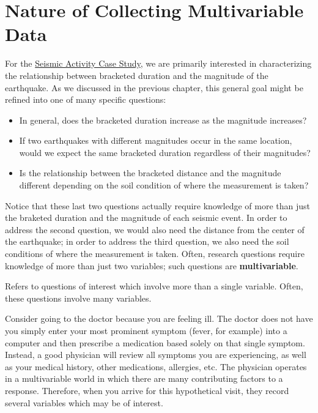 \documentclass[]{book}
\providecommand{\tightlist}{%
  \setlength{\itemsep}{0pt}\setlength{\parskip}{0pt}}
\theoremstyle{definition}
\theoremstyle{definition}
\theoremstyle{definition}
\theoremstyle{remark}
\let\BeginKnitrBlock\begin \let\EndKnitrBlock\end
\begin{document}
\chapter{Nature of Collecting Multivariable Data}\label{Regdata}

For the \protect\hyperlink{CaseGreece}{Seismic Activity Case Study}, we
are primarily interested in characterizing the relationship between
bracketed duration and the magnitude of the earthquake. As we discussed
in the previous chapter, this general goal might be refined into one of
many specific questions:

\begin{itemize}
\tightlist
\item
  In general, does the bracketed duration increase as the magnitude
  increases?
\item
  If two earthquakes with different magnitudes occur in the same
  location, would we expect the same bracketed duration regardless of
  their magnitudes?
\item
  Is the relationship between the bracketed distance and the magnitude
  different depending on the soil condition of where the measurement is
  taken?
\end{itemize}

Notice that these last two questions actually require knowledge of more
than just the braketed duration and the magnitude of each seismic event.
In order to address the second question, we would also need the distance
from the center of the earthquake; in order to address the third
question, we also need the soil conditions of where the measurement is
taken. Often, research questions require knowledge of more than just two
variables; such questions are \textbf{multivariable}.

\BeginKnitrBlock{definition}[Multivariable]
\protect\hypertarget{def:defn-multivariable}{}{\label{def:defn-multivariable}
{} }Refers to questions of interest which
involve more than a single variable. Often, these questions involve many
variables.
\EndKnitrBlock{definition}

Consider going to the doctor because you are feeling ill. The doctor
does not have you simply enter your most prominent symptom (fever, for
example) into a computer and then prescribe a medication based solely on
that single symptom. Instead, a good physician will review all symptoms
you are experiencing, as well as your medical history, other
medications, allergies, etc. The physician operates in a multivariable
world in which there are many contributing factors to a response.
Therefore, when you arrive for this hypothetical visit, they record
several variables which may be of interest.
\end{document}
